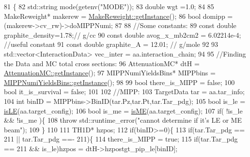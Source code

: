 \begin{DoxyCode}
81                                                                                    \{
82     std::string mode(getenv(\textcolor{stringliteral}{"MODE"}));
83     \textcolor{keywordtype}{double} wgt =1.0;
84     
85     MakeReweight*  makerew =  \hyperlink{class_neutrino_flux_reweight_1_1_make_reweight_a42d1fa92a1e30bd80538188e0c9d8b4a}{MakeReweight::getInstance}();
86     \textcolor{keywordtype}{bool} domipp = (makerew->cv\_rw)->doMIPPNumi;
87 
88     \textcolor{comment}{//Some constants:}
89     \textcolor{keyword}{const} \textcolor{keywordtype}{double} graphite\_density=1.78;\textcolor{comment}{// g/cc}
90     \textcolor{keyword}{const} \textcolor{keywordtype}{double} avog\_x\_mb2cm2 = 6.02214e-4; \textcolor{comment}{//useful constant}
91     \textcolor{keyword}{const} \textcolor{keywordtype}{double} graphite\_A    = 12.01; \textcolor{comment}{// g/mole    }
92 
93     std::vector<InteractionData> vec\_inter = aa.interaction\_chain;
94 
95     \textcolor{comment}{//Finding the Data and MC total cross sections:    }
96     AttenuationMC* dtH = \hyperlink{class_neutrino_flux_reweight_1_1_attenuation_m_c_acc338217e771bf334014ed943015e6a1}{AttenuationMC::getInstance}();
97     MIPPNumiYieldsBins*  MIPPbins =  \hyperlink{class_neutrino_flux_reweight_1_1_m_i_p_p_numi_yields_bins_a7f44afe90a846812d6eabfafa8f576e4}{MIPPNumiYieldsBins::getInstance}();
98    
99     \textcolor{keywordtype}{bool} there\_is\_MIPP  = \textcolor{keyword}{false};
100     \textcolor{keywordtype}{bool} it\_is\_survival = \textcolor{keyword}{false};
101     
102     \textcolor{comment}{//MIPP:}
103     TargetData tar = aa.tar\_info;
104     \textcolor{keywordtype}{int} binID = MIPPbins->BinID(tar.Pz,tar.Pt,tar.Tar\_pdg);   
105     \textcolor{keywordtype}{bool} is\_le = \hyperlink{class_neutrino_flux_reweight_1_1_target_attenuation_reweighter_a675884a2ca166868e55bb1d6c2eac321}{isLE}(aa.target\_config);
106     \textcolor{keywordtype}{bool} is\_me = \hyperlink{class_neutrino_flux_reweight_1_1_target_attenuation_reweighter_a92d081ff9e771a79919287fba68b7a94}{isME}(aa.target\_config);
107     \textcolor{keywordflow}{if}( !is\_le &&  !is\_me )\{
108       \textcolor{keywordflow}{throw} std::runtime\_error(\textcolor{stringliteral}{"cannot determine if it's LE or ME beam"});
109     \}
110 
111     TH1D* hzpos;
112     \textcolor{keywordflow}{if}(binID>=0)\{
113        \textcolor{keywordflow}{if}(tar.Tar\_pdg == 211 || tar.Tar\_pdg ==- 211)\{
114         there\_is\_MIPP = \textcolor{keyword}{true};
115         \textcolor{keywordflow}{if}(tar.Tar\_pdg == 211 && is\_le)hzpos = dtH->hzpostgt\_pip\_le[binID];

\end{DoxyCode}
